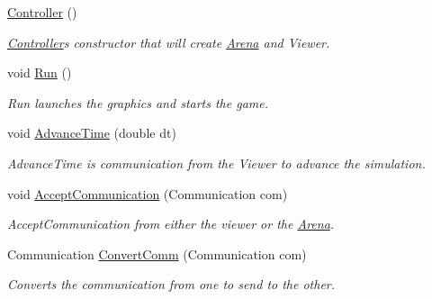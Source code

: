 \begin{DoxyCompactItemize}
\item 
\mbox{\label{class_controller_a95c56822d667e94b031451729ce069a9}} 
\mbox{\hyperlink{class_controller_a95c56822d667e94b031451729ce069a9}{Controller}} ()
\begin{DoxyCompactList}\small\item\em \mbox{\hyperlink{class_controller}{Controller}}\textquotesingle{}s constructor that will create \mbox{\hyperlink{class_arena}{Arena}} and Viewer. \end{DoxyCompactList}\item 
\mbox{\label{class_controller_a17abb2cec6c0109e9b2df3cdc082eaad}} 
void \mbox{\hyperlink{class_controller_a17abb2cec6c0109e9b2df3cdc082eaad}{Run}} ()
\begin{DoxyCompactList}\small\item\em Run launches the graphics and starts the game. \end{DoxyCompactList}\item 
\mbox{\label{class_controller_a6a4a3eaee03f6c4718da3f8293d7e053}} 
void \mbox{\hyperlink{class_controller_a6a4a3eaee03f6c4718da3f8293d7e053}{Advance\+Time}} (double dt)
\begin{DoxyCompactList}\small\item\em Advance\+Time is communication from the Viewer to advance the simulation. \end{DoxyCompactList}\item 
\mbox{\label{class_controller_a55b8d46984535adb91f40309914e8852}} 
void \mbox{\hyperlink{class_controller_a55b8d46984535adb91f40309914e8852}{Accept\+Communication}} (Communication com)
\begin{DoxyCompactList}\small\item\em Accept\+Communication from either the viewer or the \mbox{\hyperlink{class_arena}{Arena}}. \end{DoxyCompactList}\item 
Communication \mbox{\hyperlink{class_controller_ae9b0504ab74cdacc654528b609074adc}{Convert\+Comm}} (Communication com)
\begin{DoxyCompactList}\small\item\em Converts the communication from one to send to the other. \end{DoxyCompactList}\item 

\end{DoxyCompactItemize}
